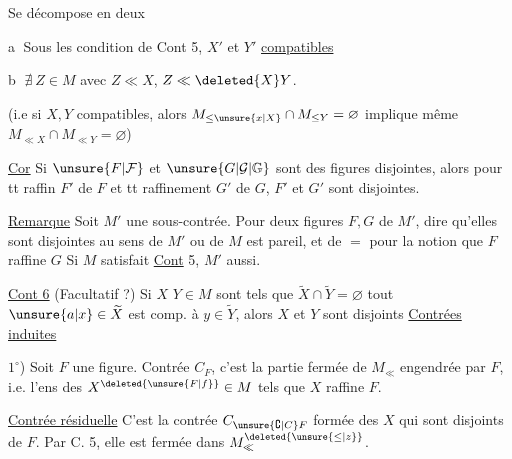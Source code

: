 Se décompose en deux

\textcircled{\scriptsize a} Sous les condition de Cont 5, $X'$ et $Y'$  \uline{compatibles}

\textcircled{\scriptsize b}  $\nexists\ Z\in M$ avec $Z\ll X$, $Z\ll\deleted{X}Y$.

(i.e si $X,Y$ compatibles, alors $M_{\leq\unsure{x|X}}\cap M_{\leq Y}=\varnothing$ implique même $M_{\ll X}\cap M_{\ll Y}=\varnothing$)

\uline{Cor} Si $\unsure{F|\mathcal F}$ et $\unsure{G|\mathcal G|\mathbb G}$ sont des figures disjointes, alors pour tt raffin $F'$ de $F$ et tt raffinement $G'$ de $G$, $F'$ et $G'$ sont disjointes.

\uline{Remarque} Soit $M'$ une sous-contrée. Pour deux figures $F,G$ de $M'$,   dire qu'elles sont disjointes au sens de $M'$ ou de $M$ est pareil, et de $=$ pour la notion que $F$ raffine $G$ Si $M$ satisfait \uline{Cont} 5, $M'$ aussi. 

\uline{Cont 6} (Facultatif ?) Si $X$  $Y\in M$ sont tels que \deleted{$\unsure{\forall}$} $\widetilde X\cap\widetilde Y=\varnothing$  tout $\unsure{a|x}\in\widetilde X$ est comp. à  $y\in\widetilde Y$, alors $X$ et $Y$ sont disjoints
\uline{Contrées induites}

$1^\circ$) Soit $F$ une figure. Contrée  $C_F$,  c'est la partie fermée de $M_{\ll}$ engendrée par $F$, i.e. l'ens des $X^{\deleted{\unsure{F|f}}}\in M$ tels que $X$ raffine $F$.

\uline{Contrée résiduelle} C'est la  contrée $C_{\unsure{\complement|C}F}$  formée des $X$  qui sont disjoints de $F$. Par C. 5, elle est   fermée dans $M^{\deleted{\unsure{\leq|z}}}_{\ll}$.

